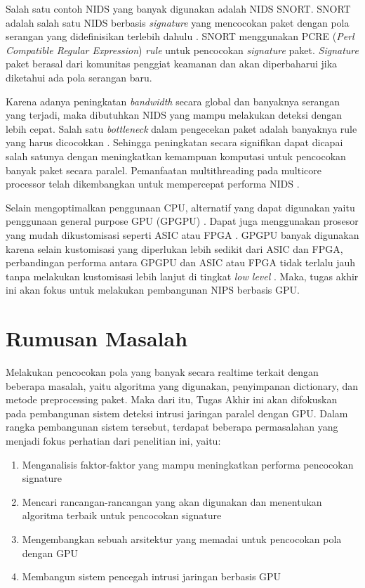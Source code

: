 Salah satu contoh NIDS yang banyak digunakan adalah NIDS SNORT. SNORT adalah salah satu NIDS berbasis \emph{signature} yang mencocokan paket dengan pola serangan yang didefinisikan terlebih dahulu \parencite{snort}. SNORT menggunakan PCRE (\emph{Perl Compatible Regular Expression}) \emph{rule} untuk pencocokan \emph{signature} paket. \emph{Signature} paket berasal dari komunitas penggiat keamanan dan akan diperbaharui jika diketahui ada pola serangan baru.

Karena adanya peningkatan \emph{bandwidth} secara global dan banyaknya serangan yang terjadi, maka dibutuhkan NIDS yang mampu melakukan deteksi dengan lebih cepat. Salah satu \emph{bottleneck} dalam pengecekan paket adalah banyaknya rule yang harus dicocokkan \parencite{pcre2007}. Sehingga peningkatan secara signifikan dapat dicapai salah satunya dengan meningkatkan kemampuan komputasi untuk pencocokan banyak paket secara paralel. Pemanfaatan multithreading pada multicore processor telah dikembangkan untuk mempercepat performa NIDS \parencite{multi2004}.

Selain mengoptimalkan penggunaan CPU, alternatif yang dapat digunakan yaitu penggunaan general purpose GPU (GPGPU) \parencite{4482891}. Dapat juga menggunakan prosesor yang mudah dikustomisasi seperti ASIC atau FPGA \parencite{fpga2008}. GPGPU banyak digunakan karena selain kustomisasi yang diperlukan lebih sedikit dari ASIC dan FPGA, perbandingan performa antara GPGPU dan ASIC atau FPGA tidak terlalu jauh tanpa melakukan kustomisasi lebih lanjut di tingkat \emph{low level} \parencite{gnort2008}. Maka, tugas akhir ini akan fokus untuk melakukan pembangunan NIPS berbasis GPU.

\section{Rumusan Masalah}

Melakukan pencocokan pola yang banyak secara realtime terkait dengan beberapa masalah, yaitu algoritma yang digunakan, penyimpanan dictionary, dan metode preprocessing paket. Maka dari itu, Tugas Akhir ini akan difokuskan pada pembangunan sistem deteksi intrusi jaringan paralel dengan GPU. Dalam rangka pembangunan sistem tersebut, terdapat beberapa permasalahan yang menjadi fokus perhatian dari penelitian ini, yaitu:

\begin{enumerate}
    \item Menganalisis faktor-faktor yang mampu meningkatkan performa pencocokan signature
    \item Mencari rancangan-rancangan yang akan digunakan dan menentukan algoritma terbaik untuk pencocokan signature
    \item Mengembangkan sebuah arsitektur yang memadai untuk pencocokan pola dengan GPU
    \item Membangun sistem pencegah intrusi jaringan berbasis GPU
\end{enumerate}

